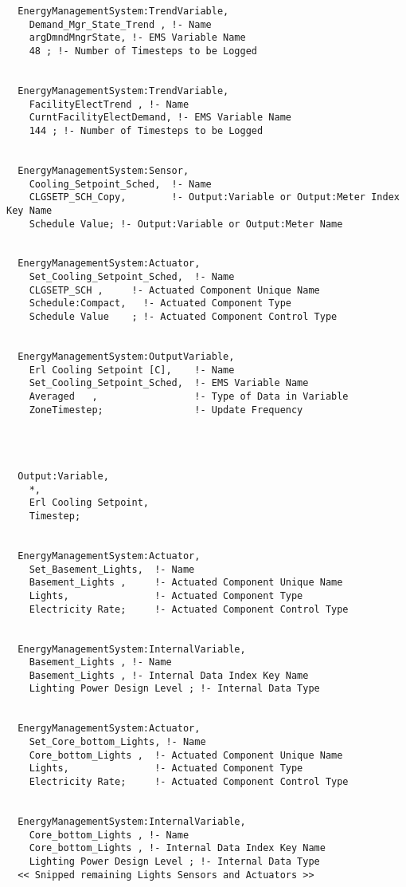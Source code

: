 \begin{lstlisting}
  EnergyManagementSystem:TrendVariable,
    Demand_Mgr_State_Trend , !- Name
    argDmndMngrState, !- EMS Variable Name
    48 ; !- Number of Timesteps to be Logged


  EnergyManagementSystem:TrendVariable,
    FacilityElectTrend , !- Name
    CurntFacilityElectDemand, !- EMS Variable Name
    144 ; !- Number of Timesteps to be Logged


  EnergyManagementSystem:Sensor,
    Cooling_Setpoint_Sched,  !- Name
    CLGSETP_SCH_Copy,        !- Output:Variable or Output:Meter Index Key Name
    Schedule Value; !- Output:Variable or Output:Meter Name


  EnergyManagementSystem:Actuator,
    Set_Cooling_Setpoint_Sched,  !- Name
    CLGSETP_SCH ,     !- Actuated Component Unique Name
    Schedule:Compact,   !- Actuated Component Type
    Schedule Value    ; !- Actuated Component Control Type


  EnergyManagementSystem:OutputVariable,
    Erl Cooling Setpoint [C],    !- Name
    Set_Cooling_Setpoint_Sched,  !- EMS Variable Name
    Averaged   ,                 !- Type of Data in Variable
    ZoneTimestep;                !- Update Frequency




  Output:Variable,
    *,
    Erl Cooling Setpoint,
    Timestep;


  EnergyManagementSystem:Actuator,
    Set_Basement_Lights,  !- Name
    Basement_Lights ,     !- Actuated Component Unique Name
    Lights,               !- Actuated Component Type
    Electricity Rate;     !- Actuated Component Control Type


  EnergyManagementSystem:InternalVariable,
    Basement_Lights , !- Name
    Basement_Lights , !- Internal Data Index Key Name
    Lighting Power Design Level ; !- Internal Data Type


  EnergyManagementSystem:Actuator,
    Set_Core_bottom_Lights, !- Name
    Core_bottom_Lights ,  !- Actuated Component Unique Name
    Lights,               !- Actuated Component Type
    Electricity Rate;     !- Actuated Component Control Type


  EnergyManagementSystem:InternalVariable,
    Core_bottom_Lights , !- Name
    Core_bottom_Lights , !- Internal Data Index Key Name
    Lighting Power Design Level ; !- Internal Data Type
  << Snipped remaining Lights Sensors and Actuators >>
\end{lstlisting}
